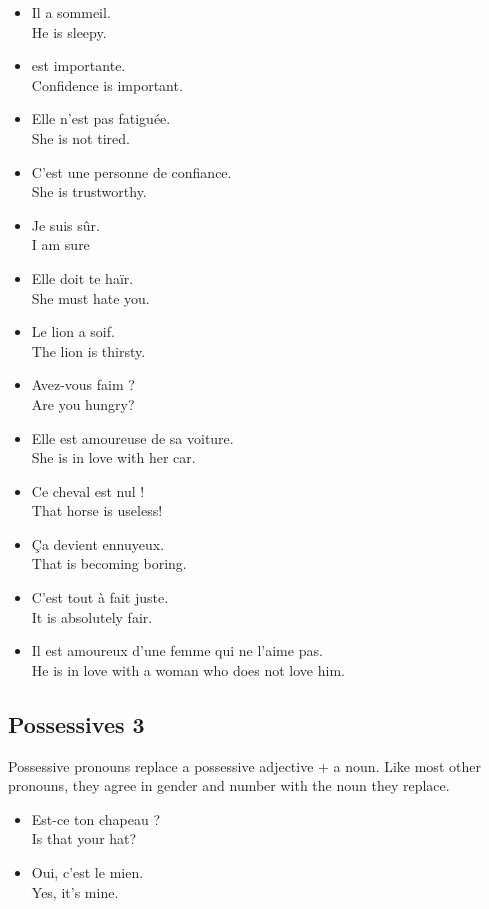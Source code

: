 \begin{itemize}
	\item  Il a sommeil. \\ He is sleepy.
	\item  {} est importante. \\ Confidence is important.
	\item  Elle n'est pas fatigu{\'e}e. \\ She is not tired.
	\item  C'est une personne de confiance. \\ She is trustworthy.
	\item  Je suis s{\^u}r. \\ I am sure
	\item  Elle doit te ha{\"i}r. \\ She must hate you.
	\item  Le lion a soif. \\ The lion is thirsty.
	\item  Avez-vous faim ? \\ Are you hungry?
	\item  Elle est amoureuse de sa voiture. \\ She is in love with her car.
	\item  Ce cheval est nul ! \\ That horse is useless!
	\item  {\c C}a devient ennuyeux. \\ That is becoming boring.
	\item  C'est tout {\`a} fait juste. \\ It is absolutely fair.
	\item  Il est amoureux d'une femme qui ne l'aime pas. \\ He is in love with a woman who does not love him.
\end{itemize}


\pagebreak
\subsection{Possessives 3}

Possessive pronouns replace a possessive adjective + a noun. Like most other pronouns, they agree in gender and number with the noun they replace. 

\begin{itemize}
  \item  Est-ce ton chapeau ? \\ Is that your hat?
	\item  Oui, c'est le mien. \\ Yes, it's mine.
\end{itemize}

